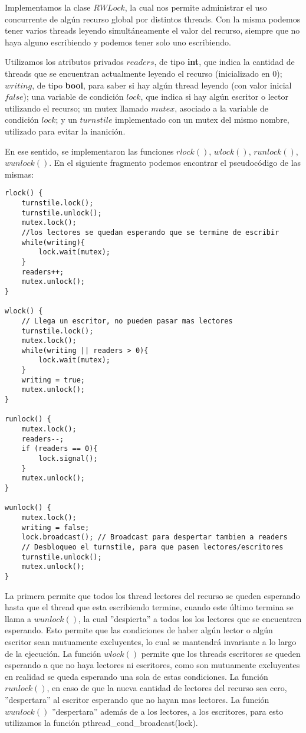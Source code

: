 Implementamos la clase $RWLock$, la cual nos permite administrar el uso concurrente de algún recurso global por distintos threads. Con la misma podemos tener varios threads leyendo simultáneamente el valor del recurso, siempre que no haya alguno escribiendo y podemos tener solo uno escribiendo.

Utilizamos los atributos privados $ readers $, de tipo \textbf{int}, que indica la cantidad de threads que se encuentran actualmente leyendo el recurso (inicializado en 0); $ writing $, de tipo \textbf{bool}, para saber si hay algún thread leyendo (con valor inicial $false$); una variable de condición $ lock $, que indica si hay algún escritor o lector utilizando el recurso; un mutex llamado $ mutex $, asociado a la variable de condición $ lock $; y un $ turnstile $ implementado con un mutex del mismo nombre, utilizado para evitar la inanición. 

En ese sentido, se implementaron las funciones $ rlock() $, $ wlock() $, $ runlock() $, $ wunlock() $. En el siguiente fragmento podemos encontrar el pseudocódigo de las mismas:

\begin{lstlisting}
rlock() {
    turnstile.lock();
    turnstile.unlock();
    mutex.lock();
    //los lectores se quedan esperando que se termine de escribir
    while(writing){
        lock.wait(mutex);
    }
    readers++;
    mutex.unlock();
}

wlock() {
    // Llega un escritor, no pueden pasar mas lectores
    turnstile.lock();
    mutex.lock();
    while(writing || readers > 0){
        lock.wait(mutex);
    }
    writing = true;
    mutex.unlock();
}

runlock() {
    mutex.lock();
    readers--;
    if (readers == 0){
        lock.signal();
    }
    mutex.unlock();
}

wunlock() {
    mutex.lock();
    writing = false;
    lock.broadcast(); // Broadcast para despertar tambien a readers
    // Desbloqueo el turnstile, para que pasen lectores/escritores
    turnstile.unlock();
    mutex.unlock();
}
\end{lstlisting}


La primera permite que todos los thread lectores del recurso se queden esperando hasta que el thread que esta escribiendo termine, cuando este último termina se llama a $ wunlock() $, la cual ''despierta'' a todos los los lectores que se encuentren esperando. Esto permite que las condiciones de haber algún lector o algún escritor sean mutuamente excluyentes, lo cual se mantendrá invariante a lo largo de la ejecución. La función $ wlock() $ permite que los threads escritores se queden esperando a que no haya lectores ni escritores, como son mutuamente excluyentes en realidad se queda esperando una sola de estas condiciones. La función $ runlock() $, en caso de que la nueva cantidad de lectores del recurso sea cero, ''despertara'' al escritor esperando que no hayan mas lectores. La función $ wunlock() $ ''despertara'' además de a los lectores, a los escritores, para esto utilizamos la función pthread_cond_broadcast(lock).

